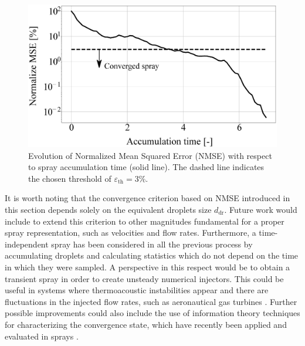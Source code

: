 \begin{figure}[h!]
	\centering
	\includegraphics[scale=0.15]{./part2_developments/figures_ch4_SLI/spray_convergence_with_text.eps}
	\caption[Evolution of Normalized Mean Squared Error (NMSE) with respect to spray accumulation time.]{Evolution of Normalized Mean Squared Error (NMSE) with respect to spray accumulation time (solid line). The dashed line indicates the chosen threshold of $\varepsilon_\mathrm{th} = 3 \%$.}
	\label{fig:NMSE_evolution}
\end{figure}



It is worth noting that the convergence criterion based on NMSE introduced in this section depends solely on the equivalent droplets size $d_\mathrm{dr}$. Future work would include to extend this criterion to other magnitudes fundamental for a proper spray representation, such as velocities and flow rates. Furthermore, a time-independent spray has been considered in all the previous process by accumulating droplets and calculating statistics which do not depend on the time in which they were sampled. A perspective in this respect would be to obtain a transient spray in order to create unsteady numerical injectors. This could be useful in systems where thermoacoustic instabilities appear and there are fluctuations in the injected flow rates, such as aeronautical gas turbines . Further possible improvements could also include the use of information theory techniques for characterizing the convergence state, which have recently been applied and evaluated in sprays .


%
%
%

